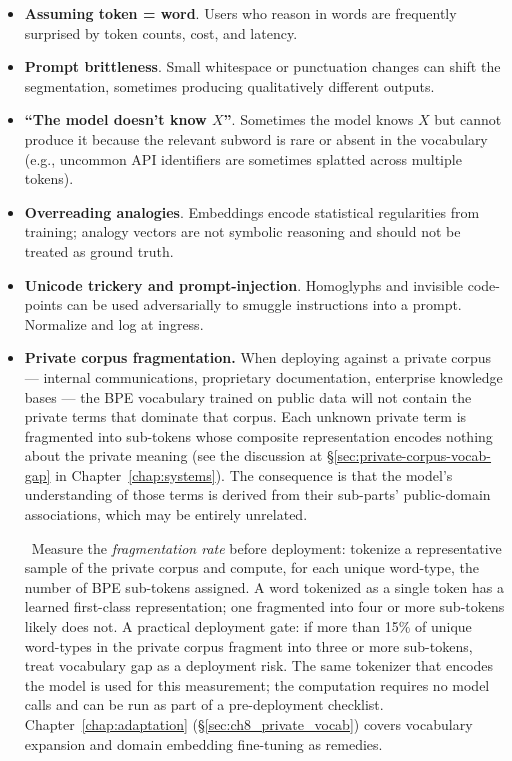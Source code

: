 \begin{itemize}
  \item \textbf{Assuming token = word}. Users who reason in words are
        frequently surprised by token counts, cost, and latency.
  \item \textbf{Prompt brittleness}. Small whitespace or punctuation
        changes can shift the segmentation, sometimes producing
        qualitatively different outputs.
  \item \textbf{``The model doesn't know $X$''}. Sometimes the model
        knows $X$ but cannot produce it because the relevant subword
        is rare or absent in the vocabulary (e.g., uncommon API
        identifiers are sometimes splatted across multiple tokens).
  \item \textbf{Overreading analogies}. Embeddings encode statistical
        regularities from training; analogy vectors are not symbolic
        reasoning and should not be treated as ground truth.
  \item \textbf{Unicode trickery and prompt-injection}. Homoglyphs and
        invisible code-points can be used adversarially to smuggle
        instructions into a prompt. Normalize and log at ingress.
  \item \textbf{Private corpus fragmentation.}
        When deploying against a private corpus --- internal
        communications, proprietary documentation, enterprise
        knowledge bases --- the BPE vocabulary trained on public
        data will not contain the private terms that dominate that
        corpus. Each unknown private term is fragmented into
        sub-tokens whose composite representation encodes nothing
        about the private meaning (see the discussion at
        \S\ref{sec:private-corpus-vocab-gap} in Chapter~\ref{chap:systems}). The
        consequence is that the model's understanding of those
        terms is derived from their sub-parts' public-domain
        associations, which may be entirely unrelated.

        \Emp\ Measure the \emph{fragmentation rate} before
        deployment: tokenize a representative sample of the private
        corpus and compute, for each unique word-type, the number
        of BPE sub-tokens assigned. A word tokenized as a single
        token has a learned first-class representation; one
        fragmented into four or more sub-tokens likely does not.
        A practical deployment gate: if more than 15\% of unique
        word-types in the private corpus fragment into three or more
        sub-tokens, treat vocabulary gap as a deployment risk.
        The same tokenizer that encodes the model is used for this
        measurement; the computation requires no model calls and
        can be run as part of a pre-deployment checklist. Chapter~\ref{chap:adaptation}
        (\S\ref{sec:ch8_private_vocab}) covers vocabulary expansion
        and domain embedding fine-tuning as remedies.
\end{itemize}

